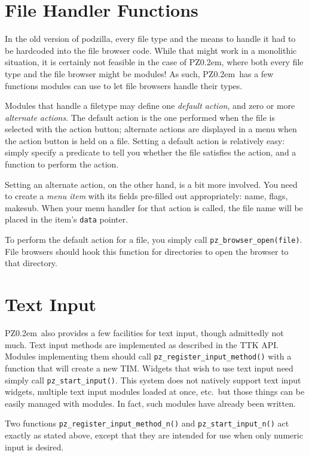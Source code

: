 \documentclass[12pt,letterpaper]{report}
\def\pz{{\footnotesize PZ}}
\def\pzt{\pz\kern0.2em{\large\oldstyle2}}
\begin{document}
\section{File Handler Functions}
In the old version of podzilla, every file type and the means to handle it had to be hardcoded
into the file browser code. While that might work in a monolithic situation, it is certainly
not feasible in the case of \pzt, where both every file type and the file browser might be
modules! As such, \pzt\ has a few functions modules can use to let file browsers handle
their types.

Modules that handle a filetype may define one {\sl default action}, and zero or more {\sl
alternate actions}. The default action is the one performed when the file is selected
with the action button; alternate actions are displayed in a menu when the action button
is held on a file. Setting a default action is relatively easy: simply specify a predicate
to tell you whether the file satisfies the action, and a function to perform the action.

Setting an alternate action, on the other hand, is a bit more involved. You need to
create a {\it menu item} with its fields pre-filled out appropriately: name, flags,
{\sf makesub}. When your menu handler for that action is called, the file name
will be placed in the item's \verb|data| pointer.

To perform the default action for a file, you simply call \verb|pz_browser_open(file)|.
File browsers should hook this function for directories to open the browser to that
directory.

\section{Text Input}
\pzt\ also provides a few facilities for text input, though admittedly not much.
Text input methods are implemented as described in the TTK API. Modules implementing them
should call \verb|pz_register_input_method()| with a function that will create a new
TIM. Widgets that wish to use text input need simply call \verb|pz_start_input()|.
This system does not natively support text input widgets, multiple text input modules
loaded at once, etc.~but those things can be easily managed with modules. In fact, such
modules have already been written.

Two functions \verb|pz_register_input_method_n()| and \verb|pz_start_input_n()| act exactly
as stated above, except that they are intended for use when only numeric input is desired.
\end{document}
